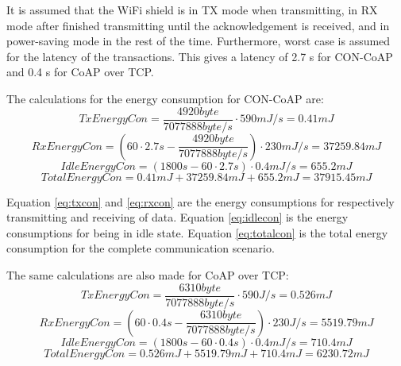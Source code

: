 It is assumed that the WiFi shield is in TX mode when transmitting, in RX mode after finished transmitting until the acknowledgement is received, and in power-saving mode in the rest of the time. Furthermore, worst case is assumed for the latency of the transactions. This gives a latency of 2.7 s for CON-CoAP and 0.4 s for CoAP over TCP.

The calculations for the energy consumption for CON-CoAP are:
\begin{equation}\label{eq:txcon}
TxEnergyCon = \frac{4920 byte}{7077888 byte/s } \cdot 590 mJ/s = 0.41 mJ   
\end{equation}
\begin{equation}\label{eq:rxcon}
RxEnergyCon = (60 \cdot 2.7 s - \frac{4920 byte}{7077888 byte/s }) \cdot 230 mJ/s = 37259.84 mJ   
\end{equation}
\begin{equation}\label{eq:idlecon}
IdleEnergyCon = (1800 s - 60 \cdot 2.7 s) \cdot 0.4 mJ/s = 655.2 mJ   
\end{equation}
\begin{equation}\label{eq:totalcon}
TotalEnergyCon = 0.41 mJ + 37259.84 mJ +655.2 mJ = 37915.45 mJ %
\end{equation}

Equation \ref{eq:txcon} and \ref{eq:rxcon} are the energy consumptions for respectively transmitting and receiving of data. Equation \ref{eq:idlecon} is the energy consumptions for being in idle state.
Equation \ref{eq:totalcon} is the total energy consumption for the complete communication scenario.

The same calculations are also made for CoAP over TCP:
\begin{equation}\label{eq:txtcp}
TxEnergyCon = \frac{6310 byte}{7077888 byte/s } \cdot 590 J/s = 0.526 mJ   
\end{equation}
\begin{equation}\label{eq:rxtcp}
RxEnergyCon = (60 \cdot 0.4 s - \frac{6310 byte}{7077888 byte/s }) \cdot 230 J/s = 5519.79 mJ   
\end{equation}
\begin{equation}\label{eq:idletcp}
IdleEnergyCon = (1800 s - 60 \cdot 0.4 s) \cdot 0.4 mJ/s = 710.4 mJ %
\end{equation}
\begin{equation}\label{eq:totaltcp}
TotalEnergyCon = 0.526 mJ + 5519.79 mJ + 710.4 mJ = 6230.72 mJ 
\end{equation}

